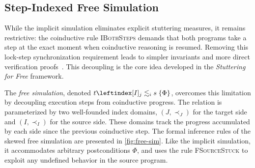 \documentclass[report.tex]{subfiles}
\begin{document}
\subsection{Step-Indexed Free Simulation}

While the implicit simulation eliminates explicit stuttering measures,
it remains restrictive:
the coinductive rule \textsc{IBothSteps}
demands that both programs take a step at the exact moment
when coinductive reasoning is resumed.
Removing this lock-step synchronization requirement
leads to simpler invariants
and more direct verification proofs~\parencite{cho-23-stuttering}.
This decoupling is the core idea
developed in the \emph{Stuttering for Free} framework.

The \emph{free simulation},
denoted $\fsim{t}{j}{i}{s}{\Phi}$,
overcomes this limitation by decoupling execution steps
from coinductive progress.
The relation is parameterized by two well-founded index domains,
$(J, \prec_J)$ for the target side
and $(I, \prec_I)$ for the source side.
These domains track the progress accumulated by each side
since the previous coinductive step.
The formal inference rules of the skewed free simulation
are presented in \cref{fig:free-sim}.
Like the implicit simulation,
it accommodates arbitrary postconditions $\Phi$,
and uses the rule \textsc{FSourceStuck}
to exploit any undefined behavior in the source program.
\end{document}

